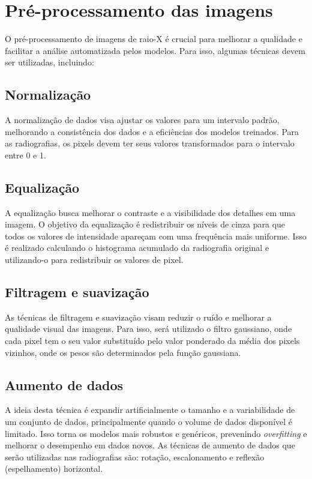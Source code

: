 \section{Pré-processamento das imagens}

O pré-processamento de imagens de raio-X é crucial para melhorar a qualidade e facilitar a análise automatizada pelos modelos. Para isso, algumas técnicas devem ser utilizadas, incluindo:

\subsection{Normalização}

A normalização de dados visa ajustar os valores para um intervalo padrão, melhorando a consistência dos dados e a eficiências dos modelos treinados. Para as radiografias, os pixels devem ter seus valores transformados para o intervalo entre 0 e 1.

\subsection{Equalização}

A equalização busca melhorar o contraste e a visibilidade dos detalhes em uma imagem. O objetivo da equalização é redistribuir os níveis de cinza para que todos os valores de intensidade apareçam com uma frequência mais uniforme. Isso é realizado calculando o histograma acumulado da radiografia original e utilizando-o para redistribuir os valores de pixel.

\subsection{Filtragem e suavização}

As técnicas de filtragem e suavização visam reduzir o ruído e melhorar a qualidade visual das imagens. Para isso, será utilizado o filtro gaussiano, onde cada pixel tem o seu valor substituído pelo valor ponderado da média dos pixels vizinhos, onde os pesos são determinados pela função gaussiana.

\subsection{Aumento de dados}

A ideia desta técnica é expandir artificialmente o tamanho e a variabilidade de um conjunto de dados, principalmente quando o volume de dados disponível é limitado. Isso torna os modelos mais robustos e genéricos, prevenindo \textit{overfitting} e melhorar o desempenho em dados novos. As técnicas de aumento de dados que serão utilizadas nas radiografias são: rotação, escalonamento e reflexão (espelhamento) horizontal.

